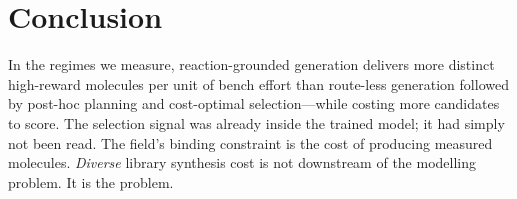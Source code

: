 \documentclass{article}
\newcommand{\checkval}[1]{\textcolor{blue}{#1}}
\begin{document}

\section{Conclusion}

In the regimes we measure, reaction-grounded generation delivers more distinct high-reward molecules per unit of bench effort than route-less generation followed by post-hoc planning and cost-optimal selection---while costing more candidates to score. The selection signal was already inside the trained model; it had simply not been read. The field's binding constraint is the cost of producing measured molecules. \emph{Diverse} library synthesis cost is not downstream of the modelling problem. It is the problem.





\appendix
\end{document}
